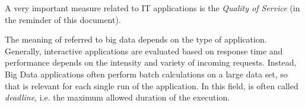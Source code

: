 

A very important measure related to IT applications is the \textit{Quality of Service} (\qos in the reminder of this document).

The meaning of \qos referred to big data depends on the type of application. Generally, interactive applications are evaluated based on response time and performance depends on the intensity and variety of incoming requests. Instead, Big Data applications often perform batch calculations on a large data set, so that \qos is relevant for each single run of the application. In this field, \qos is often called \textit{deadline}, i.e. the maximum allowed  duration of the execution. %



